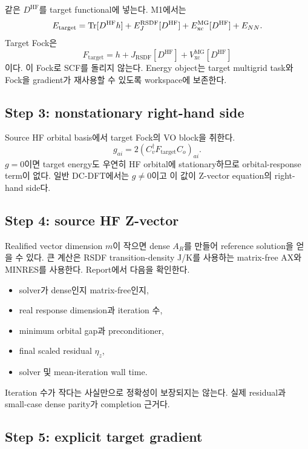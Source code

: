 같은 $D^{\mathrm{HF}}$를 target functional에 넣는다. M1에서는
\begin{equation}
  E_{\mathrm{target}}
  =\operatorname{Tr}[D^{\mathrm{HF}}h]+E_J^{\mathrm{RSDF}}[D^{\mathrm{HF}}]
   +E_{\mathrm{xc}}^{\mathrm{MG}}[D^{\mathrm{HF}}]+E_{NN}.
\end{equation}
Target Fock은
\begin{equation}
  F_{\mathrm{target}}
  =h+J_{\mathrm{RSDF}}[D^{\mathrm{HF}}]
    +V_{\mathrm{xc}}^{\mathrm{MG}}[D^{\mathrm{HF}}]
\end{equation}
이다. 이 Fock로 SCF를 돌리지 않는다. Energy object는 target multigrid task와 Fock을
gradient가 재사용할 수 있도록 workspace에 보존한다.

\subsection{Step 3: nonstationary right-hand side}

Source HF orbital basis에서 target Fock의 VO block을 취한다.
\begin{equation}
  g_{ai}=2(C_v^\dagger F_{\mathrm{target}}C_o)_{ai}.
\end{equation}
$g=0$이면 target energy도 우연히 HF orbital에 stationary하므로 orbital-response term이
없다. 일반 DC-DFT에서는 $g\ne0$이고 이 값이 Z-vector equation의 right-hand side다.

\subsection{Step 4: source HF Z-vector}

Realified vector dimension $m$이 작으면 dense $A_R$를 만들어 reference solution을 얻을
수 있다. 큰 계산은 RSDF transition-density J/K를 사용하는 matrix-free AX와 MINRES를
사용한다. Report에서 다음을 확인한다.
\begin{itemize}
  \item solver가 dense인지 matrix-free인지,
  \item real response dimension과 iteration 수,
  \item minimum orbital gap과 preconditioner,
  \item final scaled residual $\eta_z$,
  \item solver 및 mean-iteration wall time.
\end{itemize}
Iteration 수가 작다는 사실만으로 정확성이 보장되지는 않는다. 실제 residual과 small-case
dense parity가 completion 근거다.

\subsection{Step 5: explicit target gradient}

